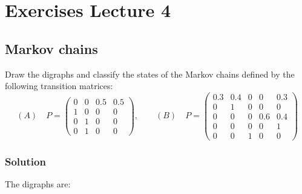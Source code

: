 \documentclass[../main.tex]{subfiles}
\begin{document}
\chapter{Exercises Lecture 4}

\section{Markov chains}
Draw the digraphs and classify the states of the Markov chains defined by the following transition matrices:
\[
(A)\quad P=
\begin{pmatrix}
0 & 0 & 0.5 & 0.5 \\
1 & 0 & 0 & 0 \\
0 & 1 & 0 & 0 \\
0 & 1 & 0 & 0
\end{pmatrix},
\quad\quad
(B) \quad P =
\begin{pmatrix}
0.3 & 0.4 & 0 & 0 & 0.3 \\
0 & 1 & 0 & 0 & 0 \\
0 & 0 & 0 & 0.6 & 0.4 \\
0 & 0 & 0 & 0 & 1 \\
0 & 0 & 1 & 0 & 0
\end{pmatrix}
\]

\subsection{Solution}

The digraphs are:
\end{document}
